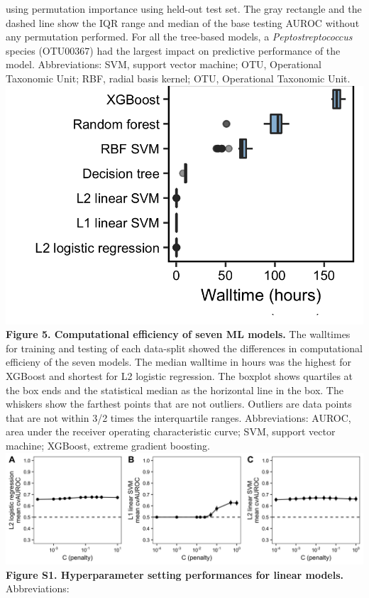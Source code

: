 \documentclass[11pt,]{article}
\begin{document}
using permutation importance using held-out test set. The gray rectangle
and the dashed line show the IQR range and median of the base testing
AUROC without any permutation performed. For all the tree-based models,
a \emph{Peptostreptococcus} species (OTU00367) had the largest impact on
predictive performance of the model. Abbreviations: SVM, support vector
machine; OTU, Operational Taxonomic Unit; RBF, radial basis kernel; OTU,
Operational Taxonomic Unit. \newpage
\includegraphics{Figure_5.png} \textbf{Figure 5. Computational
efficiency of seven ML models.} The walltimes for training and testing
of each data-split showed the differences in computational efficieny of
the seven models. The median walltime in hours was the highest for
XGBoost and shortest for L2 logistic regression. The boxplot shows
quartiles at the box ends and the statistical median as the horizontal
line in the box. The whiskers show the farthest points that are not
outliers. Outliers are data points that are not within 3/2 times the
interquartile ranges. Abbreviations: AUROC, area under the receiver
operating characteristic curve; SVM, support vector machine; XGBoost,
extreme gradient boosting.\\
\newpage
\includegraphics{Figure_S1.png} \textbf{Figure S1. Hyperparameter
setting performances for linear models.} Abbreviations: \newpage
\end{document}
